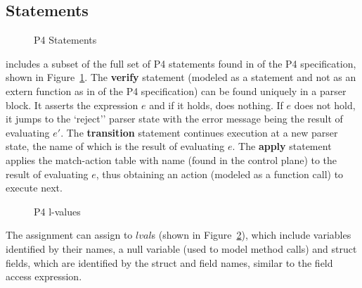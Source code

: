 \documentclass[UTF8]{article}
\begin{document}
\newpage
\newcommand{\accept}{``accept''}
\newcommand{\reject}{`reject''}
\subsection{Statements} \label{ssec:stmt}

\begin{figure}[h!]
\centering\ottgrammartabular{
\ottstmt\ottafterlastrule
}
\caption{P4 Statements}
\label{fig:stmt}
\end{figure}

\pfott{} includes a subset of the full set of P4 statements found in  of the P4 specification, shown in Figure~\ref{fig:stmt}. The \textbf{verify} statement (modeled as a statement and not as an extern function as in  of the P4 specification) can be found uniquely in a parser block. It asserts the expression $e$ and if it holds, does nothing. If $e$ does not hold, it jumps to the \reject{} parser state with the error message being the result of evaluating $e'$. The \textbf{transition} statement continues execution at a new parser state, the name of which is the result of evaluating $e$. The \textbf{apply} statement applies the match-action table with name \tn{} (found in the control plane) to the result of evaluating $e$, thus obtaining an action (modeled as a function call) to execute next.

\begin{figure}[h!]
\centering\ottgrammartabular{
\ottlval\ottafterlastrule
}
\caption{P4 l-values}
\label{fig:lval}
\end{figure}

The assignment can assign to $lval$s (shown in Figure~\ref{fig:lval}), which include variables identified by their names, a null variable (used to model method calls) and struct fields, which are identified by the struct and field names, similar to the field access expression.

\newpage
\newcommand{\exstate}{\ensuremath{s}}
\newcommand{\currsf}{\ensuremath{\varepsilon}}
\newcommand{\gscope}{\ensuremath{{\gamma}_G}}
\newcommand{\gscopel}{\ensuremath{\bar{\gamma}_G}}
\newcommand{\escope}{\ensuremath{{\gamma}_{\emptyset}}}
\newcommand{\cstack}{E}
\newcommand{\status}{\ensuremath{t}}
\newcommand{\running}{\textbf{run}}
\newcommand{\returnst}[1]{\ensuremath{\textbf{ret}\,\,#1}}
\newcommand{\trans}[1]{\textbf{tra} #1}
\newcommand{\sterr}{\ensuremath{\bot}}
\newcommand{\pfin}{\ensuremath{p_{\mathrm{fin}}}}
\newcommand{\expr}{\ensuremath{e}}
\newcommand{\varstar}{\mathbf{var \, star}}
\newcommand{\scope}{\gamma}
\newcommand{\scopeL}{\overrightarrow{\gamma}}
\newcommand{\cons}{, ... \, ,}
\newcommand{\concat}{{+}\mspace{-8mu}{+}}
\newcommand{\funn}{\ensuremath{funn}}
\newcommand{\bitv}{\ensuremath{bitv}}
\newcommand{\estmt}{\emptyset_{ \mathrm{stmt} }}
\newcommand{\frameL}{\overrightarrow{\Phi}}
\newcommand{\declL}{\overrightarrow{decl}}
\end{document}
